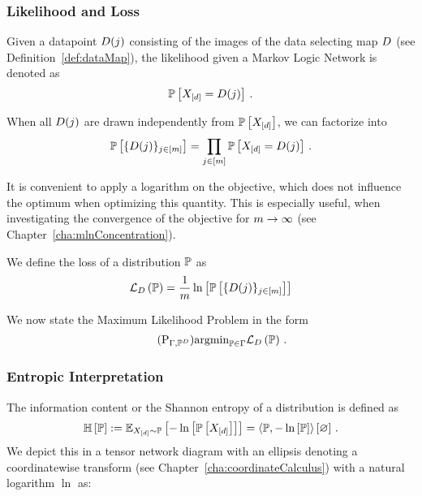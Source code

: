 \subsubsection{Likelihood and Loss}

Given a datapoint $D(j)$ consisting of the images of the data selecting map $D$ (see Definition~\ref{def:dataMap}), the likelihood given a Markov Logic Network is denoted as
	\[ \mathbb{P}\left[X_{[d]} = D(j)\right] \, . \]
	
When all $D(j)$ are drawn independently from $\mathbb{P}\left[X_{[d]}\right]$, we can factorize into
	\[ \mathbb{P}\left[\{D(j)\}_{j\in[m]}\right]  = \prod_{j\in[m]} \mathbb{P}\left[X_{[d]}=D(j)\right] \, . \]

It is convenient to apply a logarithm on the objective, which does not influence the optimum when optimizing this quantity.
This is especially useful, when investigating the convergence of the objective for $m\rightarrow\infty$ (see Chapter~\ref{cha:mlnConcentration}).

\begin{definition}\label{def:loss}
	We define the loss of a distribution $\mathbb{P}$ as
	\begin{align*}%
		\lossof{\probtensor} 
		= \frac{1}{\datanum} \lnof{\probof{\data}} 
	\end{align*}
\end{definition}

We now state the Maximum Likelihood Problem in the form
\begin{align}\tag{$\mathrm{P}_{\Gamma, \empdistribution}$}\label{prob:parameterMaxLikelihood}
	\argmin_{\probtensor\in\Gamma} \lossof{\probtensor} \, . %
\end{align}



\subsubsection{Entropic Interpretation}

\begin{definition}
	The information content or the Shannon entropy of a distribution is defined as
		\[ \mathbb{H}\left[\mathbb{P}\right] 
		:= \mathbb{E}_{X_{[d]}\sim\mathbb{P}}\left[-\ln \left[ \mathbb{P}\left[X_{[d]}\right] \right]\right] 
		= \left\langle \mathbb{P},-\ln \left[ \mathbb{P} \right]\right\rangle \left[ \varnothing \right] \, . \]
	We depict this in a tensor network diagram with an ellipsis denoting a coordinatewise transform (see Chapter~\ref{cha:coordinateCalculus}) with a natural logarithm $\ln$ as:
	\begin{center}
		
	\end{center}
\end{definition}

